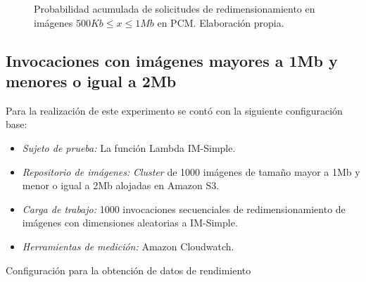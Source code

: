 \begin{figure}[h]
\hspace{-1cm}
\caption[\hspace{0.2cm} Probabilidad acumulada de solicitudes de redimensionamiento en imágenes $500Kb \leq x \leq 1Mb$ en PCM]{Probabilidad acumulada de solicitudes de redimensionamiento en imágenes $500Kb \leq x \leq 1Mb$ en PCM. Elaboración propia.}
\label{fig:funcion-acumulada-palladio-1mb}
\end{figure}


\subsection{Invocaciones con imágenes mayores a 1Mb y menores o igual a 2Mb}
Para la realización de este experimento se contó con la siguiente configuración base:
\begin{itemize}
    \item \emph{Sujeto de prueba:} La función Lambda IM-Simple.
    \item \emph{Repositorio de imágenes:} \emph{Cluster} de 1000 imágenes de tamaño mayor a 1Mb y menor o igual a 2Mb alojadas en Amazon S3.     
    \item \emph{Carga de trabajo:} 1000 invocaciones secuenciales de redimensionamiento de imágenes con dimensiones aleatorias a IM-Simple.
    \item \emph{Herramientas de medición:} Amazon Cloudwatch.
\end{itemize}

Configuración para la obtención de datos de rendimiento

